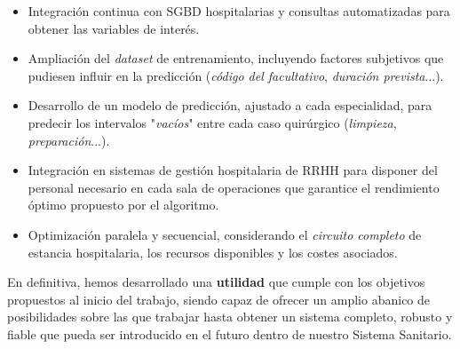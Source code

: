 \begin{itemize}
    \item Integración continua con SGBD hospitalarias y consultas automatizadas para obtener las variables de interés.
    \item Ampliación del \textit{dataset} de entrenamiento, incluyendo factores subjetivos que pudiesen influir en la predicción (\textit{código del facultativo}, \textit{duración prevista}...).
    \item Desarrollo de un modelo de predicción, ajustado a cada especialidad, para predecir los intervalos "\textit{vacíos}" entre cada caso quirúrgico (\textit{limpieza}, \textit{preparación}...).
    \item Integración en sistemas de gestión hospitalaria de RRHH para disponer del personal necesario en cada sala de operaciones que garantice el rendimiento óptimo propuesto por el algoritmo.
    \item Optimización paralela y secuencial, considerando el \textit{circuito completo} de estancia hospitalaria, los recursos disponibles y los costes asociados.
\end{itemize}

En definitiva, hemos desarrollado una \textbf{utilidad} que cumple con los objetivos propuestos al inicio del trabajo, siendo capaz de ofrecer un amplio abanico de posibilidades sobre las que trabajar hasta obtener un sistema completo, robusto y fiable que pueda ser introducido en el futuro dentro de nuestro Sistema Sanitario.
